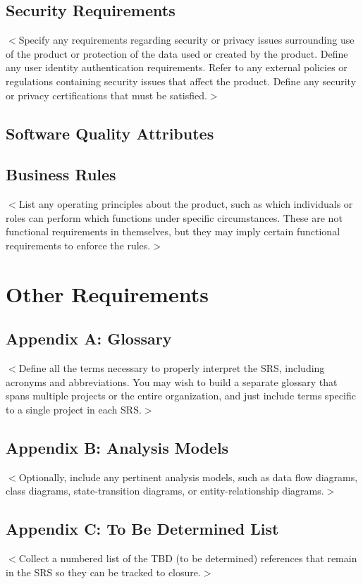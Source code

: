 \documentclass{scrreprt}
\begin{document}
\section{Security Requirements}
$<$Specify any requirements regarding security or privacy issues surrounding use 
of the product or protection of the data used or created by the product. Define 
any user identity authentication requirements. Refer to any external policies or 
regulations containing security issues that affect the product. Define any 
security or privacy certifications that must be satisfied.$>$

\section{Software Quality Attributes}


\section{Business Rules}
$<$List any operating principles about the product, such as which individuals or 
roles can perform which functions under specific circumstances. These are not 
functional requirements in themselves, but they may imply certain functional 
requirements to enforce the rules.$>$


\chapter{Other Requirements}


\section{Appendix A: Glossary}
$<$Define all the terms necessary to properly interpret the SRS, including 
acronyms and abbreviations. You may wish to build a separate glossary that spans 
multiple projects or the entire organization, and just include terms specific to 
a single project in each SRS.$>$

\section{Appendix B: Analysis Models}
$<$Optionally, include any pertinent analysis models, such as data flow 
diagrams, class diagrams, state-transition diagrams, or entity-relationship 
diagrams.$>$

\section{Appendix C: To Be Determined List}
$<$Collect a numbered list of the TBD (to be determined) references that remain 
in the SRS so they can be tracked to closure.$>$
\end{document}

